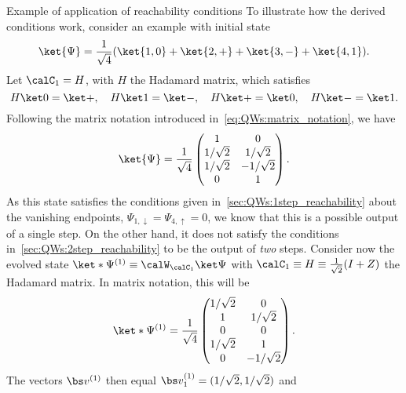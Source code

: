 \begin{examplebox}[label=ex:QWs:conditions_few_steps]{Example of application of reachability conditions}
\fontsize{10pt}{10pt}\selectfont
    To illustrate how the derived conditions work, consider an example with initial state
    \begin{equation}
        \ket{\Psi} = \frac{1}{\sqrt4} (
        \ket{1,0} + \ket{2,+} + \ket{3, -} + \ket{4, 1}
        ).
    \end{equation}
    Let $\calC_1=H$, with $H$ the Hadamard matrix, which satisfies
    \begin{equation}
        H\ket0=\ket+, \quad H\ket1=\ket-,
        \quad H\ket+=\ket0, \quad H\ket-=\ket1.
    \end{equation}
    Following the matrix notation introduced in~\cref{eq:QWs:matrix_notation}, we have
    \begin{equation}
        \ket{\Psi} =
        \frac{1}{\sqrt4}
        \begin{pmatrix}
            1 & 0 \\
            1/\sqrt2 & 1/\sqrt2 \\
            1/\sqrt2 & -1/\sqrt2 \\
            0 & 1
        \end{pmatrix}.
    \end{equation}
    As this state satisfies the conditions given in~\cref{sec:QWs:1step_reachability} about the vanishing endpoints, $\Psi_{1,\downarrow}=\Psi_{4,\uparrow}=0$, we know that this is a possible output of a single step. On the other hand, it does not satisfy the conditions in~\cref{sec:QWs:2step_reachability} to be the output of \textit{two} steps.
    Consider now the evolved state $\ket*{\Psi^{(1)}}\equiv\calW_{\calC_1}\ket\Psi$ with $\calC_1\equiv H\equiv\frac{1}{\sqrt2}(I+Z)$ the Hadamard matrix. In matrix notation, this will be
    \begin{equation}
        \ket*{\Psi^{(1)}} =
        \frac{1}{\sqrt4}
        \begin{pmatrix}
            1/\sqrt2 & 0 \\
            1 & 1/\sqrt2 \\ 
            0 & 0 \\
            1/\sqrt2 & 1 \\
            0 & -1/\sqrt2
        \end{pmatrix}.
        \label{eq:QWs:example_psi'}
    \end{equation}
    The vectors $\bs v^{(1)}$ then equal $\bs v^{(1)}_1=(1/\sqrt2, 1/\sqrt2)$ and

\end{examplebox}
